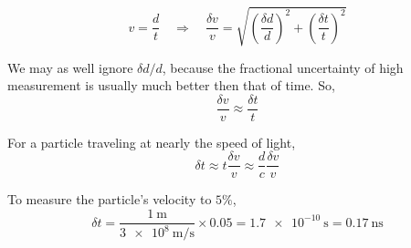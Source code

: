 \begin{equation}
  v = \frac{d}{t} \quad \Rightarrow \quad
  \frac{\delta v}{v} = \sqrt{ \left(\frac{\delta d}{d}\right)^2 + \left(\frac{\delta t}{t}\right)^2 }
\end{equation}

We may as well ignore $\delta d/d$, because the fractional uncertainty of high measurement is usually much better then that of time. So,
\begin{equation}
  \frac{\delta v}{v} \approx \frac{\delta t}{t}
\end{equation}

For a particle traveling at nearly the speed of light,
\begin{equation}
  \delta t \approx t \frac{\delta v}{v} \approx \frac{d}{c} \frac{\delta v}{v}
\end{equation}

To measure the particle's velocity to $5\%$,
\begin{equation}
  \delta t
  = \frac{\SI{1}{\meter}}{\SI{3e8}{\meter\per\second}} \times 0.05
  = \SI{1.7e-10}{\second} = \boxed{ \SI{0.17}{\nano\second} }
\end{equation}


